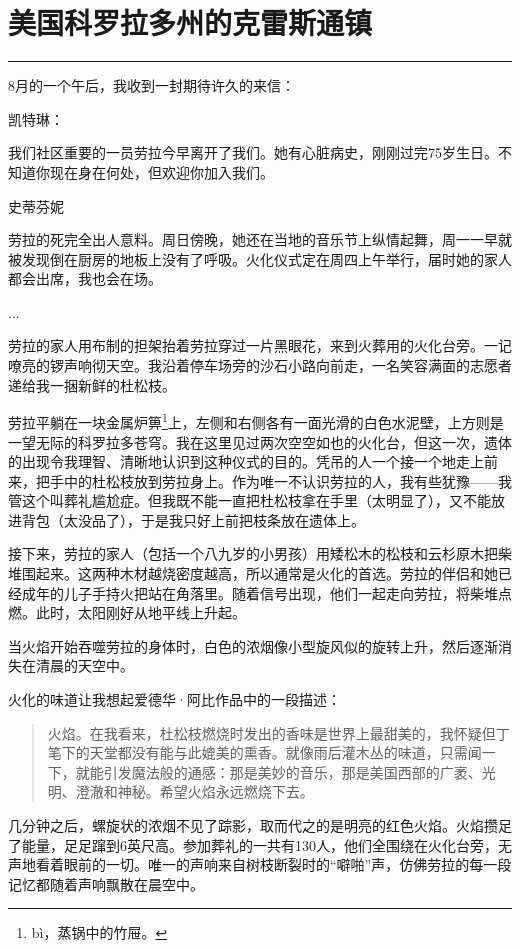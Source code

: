 \documentclass[12pt,oneside]{book}
\newcommand\hr{\par\noindent\hrule}
\begin{document}
\section{美国科罗拉多州的克雷斯通镇}
\hr
8月的一个午后，我收到一封期待许久的来信：

凯特琳：

我们社区重要的一员劳拉今早离开了我们。她有心脏病史，刚刚过完75岁生日。不知道你现在身在何处，但欢迎你加入我们。

史蒂芬妮

劳拉的死完全出人意料。周日傍晚，她还在当地的音乐节上纵情起舞，周一一早就被发现倒在厨房的地板上没有了呼吸。火化仪式定在周四上午举行，届时她的家人都会出席，我也会在场。

...

劳拉的家人用布制的担架抬着劳拉穿过一片黑眼花，来到火葬用的火化台旁。一记嘹亮的锣声响彻天空。我沿着停车场旁的沙石小路向前走，一名笑容满面的志愿者递给我一捆新鲜的杜松枝。

劳拉平躺在一块金属炉箅\footnote{bì，蒸锅中的竹屉。}上，左侧和右侧各有一面光滑的白色水泥壁，上方则是一望无际的科罗拉多苍穹。我在这里见过两次空空如也的火化台，但这一次，遗体的出现令我理智、清晰地认识到这种仪式的目的。凭吊的人一个接一个地走上前来，把手中的杜松枝放到劳拉身上。作为唯一不认识劳拉的人，我有些犹豫——我管这个叫葬礼尴尬症。但我既不能一直把杜松枝拿在手里（太明显了），又不能放进背包（太没品了），于是我只好上前把枝条放在遗体上。

接下来，劳拉的家人（包括一个八九岁的小男孩）用矮松木的松枝和云杉原木把柴堆围起来。这两种木材越烧密度越高，所以通常是火化的首选。劳拉的伴侣和她已经成年的儿子手持火把站在角落里。随着信号出现，他们一起走向劳拉，将柴堆点燃。此时，太阳刚好从地平线上升起。

当火焰开始吞噬劳拉的身体时，白色的浓烟像小型旋风似的旋转上升，然后逐渐消失在清晨的天空中。

火化的味道让我想起爱德华·阿比作品中的一段描述：

\begin{quotation}
火焰。在我看来，杜松枝燃烧时发出的香味是世界上最甜美的，我怀疑但丁笔下的天堂都没有能与此媲美的熏香。就像雨后灌木丛的味道，只需闻一下，就能引发魔法般的通感：那是美妙的音乐，那是美国西部的广袤、光明、澄澈和神秘。希望火焰永远燃烧下去。
\end{quotation}

几分钟之后，螺旋状的浓烟不见了踪影，取而代之的是明亮的红色火焰。火焰攒足了能量，足足蹿到6英尺高。参加葬礼的一共有130人，他们全围绕在火化台旁，无声地看着眼前的一切。唯一的声响来自树枝断裂时的“噼啪”声，仿佛劳拉的每一段记忆都随着声响飘散在晨空中。
\end{document}
